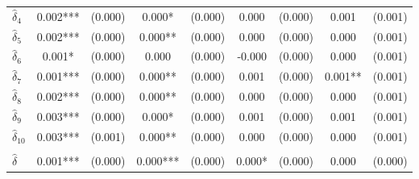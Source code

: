 {\begin{tabular}{l*{4}{cc}}
$\hat{\delta}_4$&       0.002***&     (0.000)&       0.000*  &     (0.000)&       0.000   &     (0.000)&       0.001   &     (0.001)\\
$\hat{\delta}_5$&       0.002***&     (0.000)&       0.000** &     (0.000)&       0.000   &     (0.000)&       0.000   &     (0.001)\\
$\hat{\delta}_6$&       0.001*  &     (0.000)&       0.000   &     (0.000)&      -0.000   &     (0.000)&       0.000   &     (0.001)\\
$\hat{\delta}_7$&       0.001***&     (0.000)&       0.000** &     (0.000)&       0.001   &     (0.000)&       0.001** &     (0.001)\\
$\hat{\delta}_8$&       0.002***&     (0.000)&       0.000** &     (0.000)&       0.000   &     (0.000)&       0.000   &     (0.001)\\
$\hat{\delta}_9$&       0.003***&     (0.000)&       0.000*  &     (0.000)&       0.001   &     (0.000)&       0.001   &     (0.001)\\
$\hat{\delta}_{10}$&       0.003***&     (0.001)&       0.000** &     (0.000)&       0.000   &     (0.000)&       0.000   &     (0.001)\\
\addlinespace&               &            &               &            &               &            &               &            \\
$\hat{\delta}$&       0.001***&     (0.000)&       0.000***&     (0.000)&       0.000*  &     (0.000)&       0.000   &     (0.000)\\
\bottomrule
\end{tabular}
}
